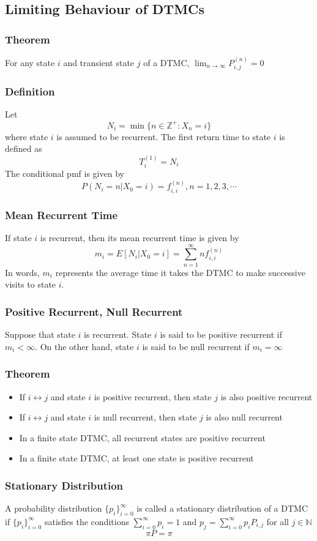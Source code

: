 \documentclass[11pt]{article}
\newcommand{\N}{{\mathbb{N}}}
\newcommand{\Z}{{\mathbb{Z}}}
\newcommand{\ds}{\displaystyle}
\begin{document}
\subsection{Limiting Behaviour of DTMCs}
\subsubsection*{Theorem}
For any state $i$ and transient state $j$ of a DTMC, $\ds\lim_{n\to\infty}P_{i,j}^{(n)} = 0$
\subsubsection*{Definition}
Let 
\[N_i=\min\{n\in\Z^+:X_n=i\}\]   
where state $i$ is assumed to be recurrent. The first return time to state $i$ is defined as 
\[T_i^{(1)} = N_i\]   
The conditional pmf is given by 
\[P(N_i=n|X_0=i)=f_{i,i}^{(n)}, n=1,2,3,\cdots\]    
\subsubsection{Mean Recurrent Time}
If state $i$ is recurrent, then its mean recurrent time is given by 
\[m_i = E[N_i|X_0=i] = \sum_{n=1}^{\infty}n f_{i,i}^{(n)}\]   
In words, $m_i$ represents the average time it takes the DTMC to make successive visits to state $i$. 
\subsubsection{Positive Recurrent, Null Recurrent}
Suppose that state $i$ is recurrent. State $i$ is said to be positive recurrent if $m_i<\infty$. On the other hand, state $i$ is said to be null recurrent if $m_i=\infty$
\subsubsection*{Theorem}
\begin{itemize}
    \item If $i\leftrightarrow j$ and state $i$ is positive recurrent, then state $j$ is also positive recurrent 
    \item If $i\leftrightarrow j$ and state $i$ is null recurrent, then state $j$ is also null recurrent
    \item In a finite state DTMC, all recurrent states are positive recurrent
    \item In a finite state DTMC, at least one state is positive recurrent
\end{itemize}
\subsubsection{Stationary Distribution}
A probability distribution $\{p_i\}_{i=0}^{\infty}$ is called a stationary distribution of a DTMC if 
$\{p_i\}_{i=0}^{\infty}$ satisfies the conditions $\ds\sum_{i=0}^{\infty}p_i=1$ and $p_j=\ds\sum_{i=0}^{\infty}p_iP_{i,j}$ for all $j\in\N$
\[\pi P = \pi\]
\end{document}
